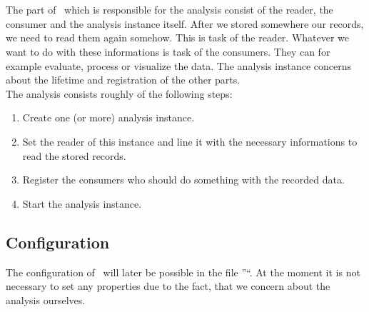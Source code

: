 \documentclass[a4paper, oneside, 11pt]{scrartcl}
\begin{document}
\section{\KiekerAnalysis}
The part of \Kieker\ which is responsible for the analysis consist of the reader, the consumer and the analysis instance itself. After we stored somewhere our records, we need to read them again somehow. This is task of the reader. Whatever we want to do with these informations is task of the consumers. They can for example evaluate, process or visualize the data. The analysis instance concerns about the lifetime and registration of the other parts.\\
The analysis consists roughly of the following steps:
\begin{enumerate}
 \item Create one (or more) analysis instance.
 \item Set the reader of this instance and line it with the necessary informations to read the stored records.
 \item Register the consumers who should do something with the recorded data.
 \item Start the analysis instance.
\end{enumerate}
\subsection{Configuration}
The configuration of \KiekerAnalysis\ will later be possible in the file ''\analysisPropertiesFile``. At the moment it is not necessary to set any properties due to the fact, that we concern about the analysis ourselves. 
\end{document}

